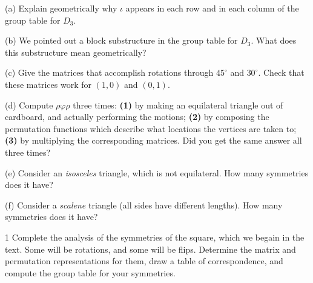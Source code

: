 \begin{problem}[Warmup]{(a)}
    Explain geometrically why $\iota$ appears in each row and in each column of the group table for $D_3$.
\end{problem}
\unsolved

\begin{problem}[Warmup]{(b)}
    We pointed out a block substructure in the group table for $D_3$. What does this substructure mean geometrically?
\end{problem}
\unsolved

\begin{problem}[Warmup]{(c)}
    Give the matrices that accomplish rotations through $45^\circ$ and $30^\circ$. Check that these matrices work for $(1, 0)$ and $(0, 1)$.
\end{problem}
\unsolved

\begin{problem}[Warmup]{(d)}
    Compute $\rho\varphi\rho$ three times: \textbf{(1)} by making an equilateral triangle out of cardboard, and actually performing the motions; \textbf{(2)} by composing the permutation functions which describe what locations the vertices are taken to; \textbf{(3)} by multiplying the corresponding matrices. Did you get the same answer all three times?
\end{problem}
\unsolved

\begin{problem}[Warmup]{(e)}
    Consider an \emph{isosceles} triangle, which is not equilateral. How many symmetries does it have?
\end{problem}
\unsolved

\begin{problem}[Warmup]{(f)}
    Consider a \emph{scalene} triangle (all sides have different lengths). How many symmetries does it have?
\end{problem}
\unsolved

\begin{problem}{1}
    Complete the analysis of the symmetries 
    of the square, which we begain in the text.
    Some will be rotations, and some will be flips.
    Determine the matrix and permutation representations
    for them, draw a table of correspondence, and compute 
    the group table for your symmetries.
\end{problem}
\solved

